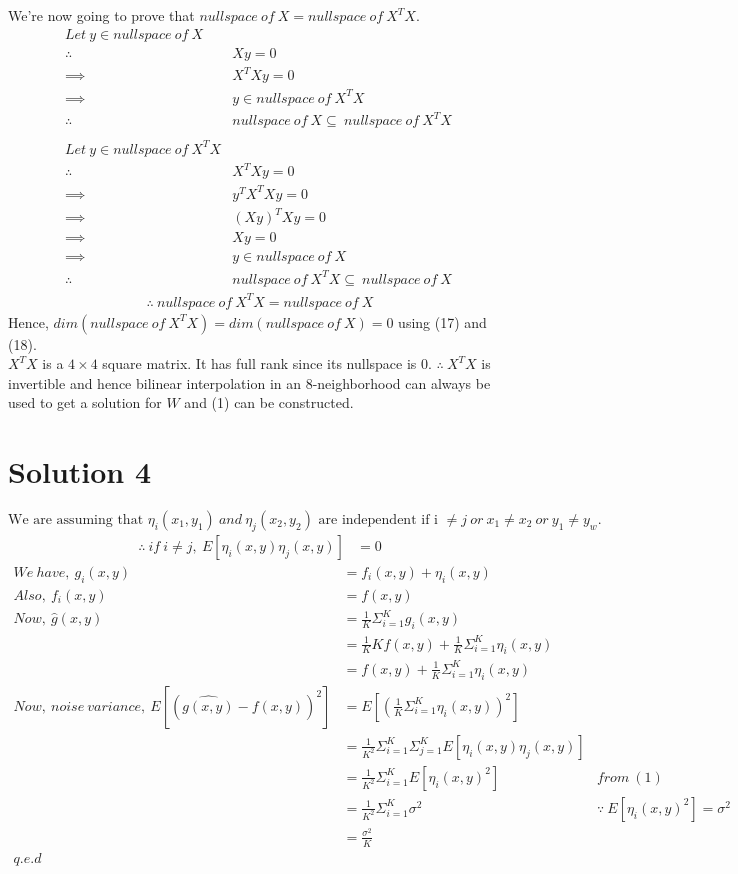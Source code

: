 \documentclass[a4paper,fleqn,11pt]{article}
\theoremstyle{mytheor}
\begin{document}
We're now going to prove that $nullspace\ of\ X = nullspace\ of\ X^TX$.
\begin{align*}
Let\ y \in nullspace\ of\ X \\
\therefore\ & Xy = 0 \\
\implies\ & X^TXy = 0 \\
\implies\ & y \in nullspace\ of\ X^TX \\
\therefore\ & nullspace\ of\ X \subseteq\ nullspace\ of\ X^TX \\
\\
Let\ y \in nullspace\ of\ X^TX \\
\therefore\ & X^TXy = 0 \\
\implies\ & y^TX^TXy = 0 \\
\implies\ & (Xy)^TXy = 0 \\
\implies\ & Xy = 0 \\
\implies\ & y \in nullspace\ of\ X \\
\therefore\ & nullspace\ of\ X^TX \subseteq\ nullspace\ of\ X\
\end{align*}
\begin{align}
\therefore\ nullspace\ of\ X^TX = nullspace\ of\ X
\end{align}
Hence, $dim(nullspace\ of\ X^TX) = dim(nullspace\ of\ X) = 0$ using (17) and (18). \\
$X^TX$ is a $4\times4$ square matrix. It has full rank since its nullspace is 0. $\therefore\ X^TX$ is invertible and hence bilinear interpolation in an 8-neighborhood can always be used to get a solution for $W$ and (1) can be constructed.
\section*{Solution 4}
$$\text{We are assuming that }\eta_i (x_1, y_1)\ and\ \eta_j (x_2, y_2)\text{ are independent if i }\neq j\ or\ x_1 \neq x_2\ or\ y_1 \neq y_w.$$
\begin{align}
\therefore\ if\ i \neq j,\ E[\eta_i(x, y)\eta_j(x, y)] & = 0
\end{align}
\begin{align*}
We\ have,\ g_i(x, y) & = f_i(x, y) + \eta_i(x, y) \\
Also,\ f_i(x, y) & = f(x, y) \\
Now,\ \hat{g}(x, y)& = \frac{1}{K} \Sigma_{i = 1}^K g_i(x, y) \\
& = \frac{1}{K}K f(x, y) + \frac{1}{K}\Sigma_{i = 1}^K \eta_i(x, y) \\
& = f(x, y) + \frac{1}{K}\Sigma_{i = 1}^K \eta_i(x, y) \\
Now,\ noise\ variance,\ E[(\hat{g(x, y)} - f(x, y))^2] & = E[(\frac{1}{K}\Sigma_{i = 1}^K \eta_i(x, y))^2] \\
& = \frac{1}{K^2}\Sigma_{i = 1}^K\Sigma_{j = 1}^K E[\eta_i(x, y)\eta_j(x, y)] \\
& = \frac{1}{K^2}\Sigma_{i = 1}^K E[\eta_i(x, y)^2] & from\ (1) \\
& = \frac{1}{K^2}\Sigma_{i = 1}^K \sigma^2 & \because\ E[\eta_i(x, y)^2] = \sigma^2 \\
& = \frac{\sigma^2}{K} \\
q.e.d
\end{align*}
\end{document}
